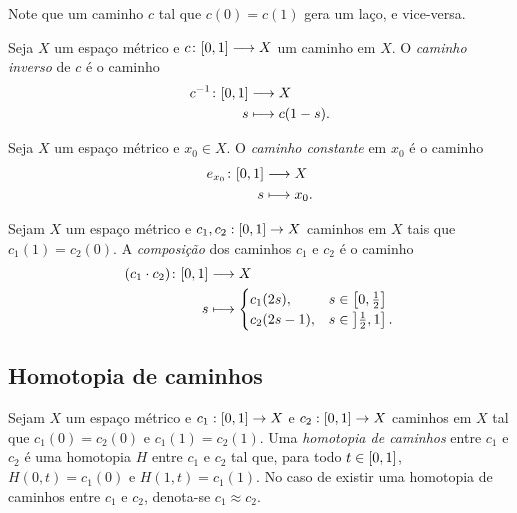 Note que um caminho $c$ tal que $c(0)=c(1)$ gera um laço, e vice-versa.

\begin{definition}
Seja $X$ um espaço métrico e ${c}\colon {\left[{0},{1}\right]} \longrightarrow {X}$ um caminho em $X$. O \emph{caminho inverso} de $c$ é o caminho
	\begin{align*}
		{c^{-1}}\colon {\left[{0},{1}\right]} &\longrightarrow {X} \\{s} &\longmapsto c(1-s).
	\end{align*}
\end{definition}

\begin{definition}
Seja $X$ um espaço métrico e $x_0 \in X$. O \emph{caminho constante} em $x_0$ é o caminho
	\begin{align*}
		{e_{x_0}}\colon {\left[{0},{1}\right]} &\longrightarrow {X} \\{s} &\longmapsto x_0.
	\end{align*}
\end{definition}

\begin{definition}
Sejam $X$ um espaço métrico e $c_1,c_2: \left[{0},{1}\right] \to X$ caminhos em $X$ tais que $c_1(1)=c_2(0)$. A \emph{composição} dos caminhos $c_1$ e $c_2$ é o caminho
	\begin{align*}
		\func{(c_1 \comp c_2)}{\intff{0}{1}}{X}{s}{
			\begin{cases}
				c_1(2s),& s \in \intff{0}{\frac{1}{2}} \\
				c_2(2s-1),& s \in \intaf{\frac{1}{2}}{1}.
			\end{cases}
		}
	\end{align*}
\end{definition}


\subsection{Homotopia de caminhos}

\begin{definition}
	Sejam $X$ um espaço métrico e $c_1: \left[{0},{1}\right] \to X$ e $c_2: \left[{0},{1}\right] \to X$ caminhos em $X$ tal que $c_1(0)=c_2(0)$ e $c_1(1)=c_2(1)$. Uma \emph{homotopia de caminhos} entre $c_1$ e $c_2$ é uma homotopia $H$ entre $c_1$ e $c_2$ tal que, para todo $t \in \left[{0},{1}\right]$, $H(0,t)=c_1(0)$ e $H(1,t)=c_1(1)$. No caso de existir uma homotopia de caminhos entre $c_1$ e $c_2$, denota-se $c_1 \approx c_2$.
\end{definition}

